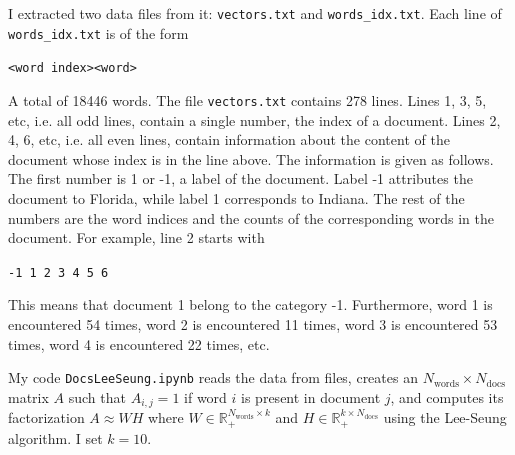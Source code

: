 \documentclass{../../../kin_math}
\begin{document}
\begin{questions}
  I extracted two data files from it: \texttt{vectors.txt} and \texttt{words\_idx.txt}. Each line of \texttt{words\_idx.txt} is of the form

  \texttt{<word index><word>}

  A total of 18446 words. The file \texttt{vectors.txt} contains 278 lines. Lines 1, 3, 5, etc, i.e. all odd lines, contain a single number, the index of a document. Lines 2, 4, 6, etc, i.e. all even lines, contain information about the content of the document whose index is in the line above. The information is given as follows. The first number is 1 or -1, a label of the document. Label -1 attributes the document to Florida, while label 1 corresponds to Indiana. The rest of the numbers are the word indices and the counts of the corresponding words in the document. For example, line 2 starts with

  \texttt{-1 1  2  3  4  5  6}

  This means that document 1 belong to the category -1. Furthermore, word 1 is encountered 54 times, word 2 is encountered 11 times, word 3 is encountered 53 times, word 4 is encountered 22 times, etc.

  My code \texttt{DocsLeeSeung.ipynb} reads the data from files, creates an $N_\text{words} \times N_\text{docs}$ matrix $A$ such that $A_{i, j} = 1$ if word $i$ is present in document $j$, and computes its factorization $A \approx WH$ where $W \in \mathbb{R}_+^{N_\text{words} \times k}$ and $H \in \mathbb{R}_+^{k \times N_\text{docs}}$ using the Lee-Seung algorithm. I set $k = 10$.


\end{questions}
\end{document}
